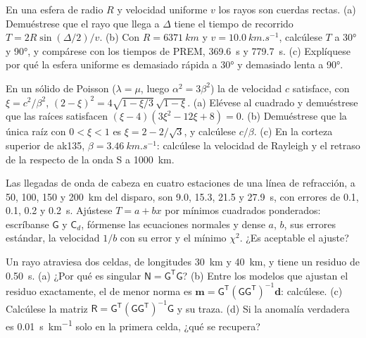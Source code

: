\begin{exercise}[$\star\star$]\label{exo:b3:seismology-imaging:5}
En una esfera de radio $R$ y velocidad uniforme $v$ los rayos son cuerdas rectas.
(a) Demuéstrese que el rayo que llega a $\Delta$ tiene el tiempo de recorrido
$T = 2R\sin(\Delta/2)/v$. (b) Con $R = \qty{6371}{km}$ y
$v = \qty{10.0}{km.s^{-1}}$, calcúlese $T$ a \ang{30} y \ang{90}, y compárese
con los tiempos de PREM, \qty{369.6}{s} y \qty{779.7}{s}. (c) Explíquese por qué la
esfera uniforme es demasiado rápida a \ang{30} y demasiado lenta a \ang{90}.
\end{exercise}

\begin{exercise}[$\star\star$]\label{exo:b3:seismology-imaging:6}
En un sólido de Poisson ($\lambda = \mu$, luego $\alpha^2 = 3\beta^2$) la 
de velocidad $c$ satisface, con $\xi = c^2/\beta^2$,
$(2 - \xi)^2 = 4\sqrt{1 - \xi/3}\,\sqrt{1 - \xi}$. (a) Elévese al cuadrado y demuéstrese
que las raíces satisfacen $(\xi - 4)(3\xi^2 - 12\xi + 8) = 0$. (b) Demuéstrese que la
única raíz con $0 < \xi < 1$ es $\xi = 2 - 2/\sqrt3$, y calcúlese $c/\beta$.
(c) En la corteza superior de ak135, $\beta = \qty{3.46}{km.s^{-1}}$: calcúlese la
velocidad de Rayleigh y el retraso de la  respecto de la onda S a
\qty{1000}{km}.
\end{exercise}

\begin{exercise}[$\star\star$]\label{exo:b3:seismology-imaging:7}
Las llegadas de onda de cabeza en cuatro estaciones de una línea de refracción, a 50, 100, 150 y
\qty{200}{km} del disparo, son 9.0, 15.3, 21.5 y \qty{27.9}{s}, con
errores de 0.1, 0.1, 0.2 y \qty{0.2}{s}. Ajústese $T = a + bx$ por mínimos cuadrados
ponderados: escríbanse $\mathsf G$ y $\mathsf C_d$, fórmense las ecuaciones normales y
dense $a$, $b$, sus errores estándar, la velocidad $1/b$ con su error y el
mínimo $\chi^2$. ¿Es aceptable el ajuste?
\end{exercise}

\begin{exercise}[$\star\star$]\label{exo:b3:seismology-imaging:8}
Un rayo atraviesa dos celdas, de longitudes \qty{30}{km} y \qty{40}{km}, y tiene
un residuo de \qty{0.50}{s}. (a) ¿Por qué es singular $\mathsf N = \mathsf G^{\mathsf T}
\mathsf G$? (b) Entre los modelos que ajustan el residuo exactamente, el de
menor norma es $\mathbf m = \mathsf G^{\mathsf T}(\mathsf G\mathsf
G^{\mathsf T})^{-1}\mathbf d$: calcúlese. (c) Calcúlese la matriz
$\mathsf R = \mathsf G^{\mathsf T}(\mathsf G\mathsf G^{\mathsf T})^{-1}\mathsf G$
y su traza. (d) Si la anomalía verdadera es \qty{0.01}{s.km^{-1}} solo en la primera
celda, ¿qué se recupera?
\end{exercise}

